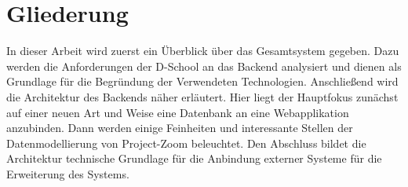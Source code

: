 \section{Gliederung}
In dieser Arbeit wird zuerst ein Überblick über das Gesamtsystem gegeben. Dazu werden die Anforderungen der D-School an das Backend analysiert und dienen als Grundlage für die Begründung der Verwendeten Technologien. Anschließend wird die Architektur des Backends näher erläutert. Hier liegt der Hauptfokus zunächst auf einer neuen Art und Weise eine Datenbank an eine Webapplikation anzubinden. Dann werden einige Feinheiten und interessante Stellen der Datenmodellierung von Project-Zoom beleuchtet. Den Abschluss bildet die Architektur technische Grundlage für die Anbindung externer Systeme für die Erweiterung des Systems.

